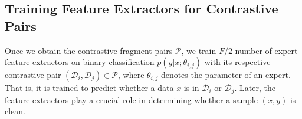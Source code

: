 \documentclass{article}
\theoremstyle{plain}
\theoremstyle{definition}
\theoremstyle{remark}
\begin{document}

\subsection{Training  Feature Extractors for Contrastive Pairs}
\label{subsec:training_feature_extractors}

Once we obtain the contrastive fragment pairs $\mathcal{P}$, we train $F/2$ number of expert feature extractors on binary classification $p(y|x;\theta_{i,j})$ with its respective contrastive pair $(\mathcal{D}_i, \mathcal{D}_j) \in \mathcal{P}$, where $\theta_{i,j}$ denotes the parameter of an expert.
That is, it is trained to predict whether a data $x$ is in $\mathcal{D}_i$ or $\mathcal{D}_j$.
Later, the feature extractors play a crucial role in determining whether a sample $(x, y)$ is clean.
\end{document}
